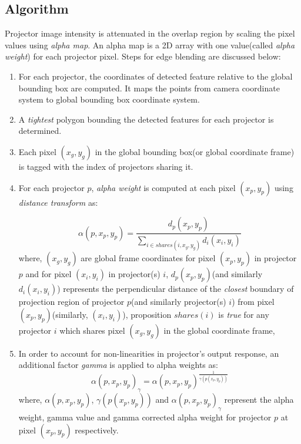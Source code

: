 \documentclass[letterpaper,10pt,conference]{/home/pranav/Desktop/Publication_work/latex_class_files/IEEEtran}
\begin{document}
\subsection{Algorithm}
Projector image intensity is attenuated in the overlap region by scaling the pixel values using \textit{alpha map}. An alpha map is a 2D array with one value(called \textit{alpha weight}) for each projector pixel. Steps for edge blending are discussed below:
\begin{enumerate}
\item For each projector, the coordinates of detected feature relative to the global bounding box are computed. It maps the points from camera coordinate system to global bounding box coordinate system. 
\item A \textit{tightest} polygon bounding the detected features for each projector is determined.
\item Each pixel $(x_g,y_g)$ in the global bounding box(or global coordinate frame) is tagged with the index of projectors sharing it.
\item For each projector $p$, \textit{alpha weight} is computed at each pixel $(x_p,y_p)$ using \textit{distance transform} as:

\begin{equation}
\alpha(p,x_p,y_p)=\frac{d_p(x_p,y_p)}{\sum\nolimits_{i \in shares(i,x_g,y_g)} d_i(x_i,y_i)}
\end{equation}
where, $(x_g,y_g)$ are global frame coordinates for pixel $(x_p,y_p)$ in projector $p$ and for pixel $(x_i,y_i)$ in projector(s) $i$, $d_p(x_p,y_p)$(and similarly $d_i(x_i,y_i)$) represents the perpendicular distance of the \textit{closest} boundary of projection region of projector $p$(and similarly projector(s) $i$) from pixel $(x_p,y_p)$(similarly, $(x_i,y_i)$), proposition $shares(i)$ is \textit{true} for any projector $i$ which shares pixel $(x_g,y_g)$ in the global coordinate frame,

\item In order to account for non-linearities in projector's output response, an additional factor \textit{gamma}\cite{paul} is applied to alpha weights as:
\begin{equation}
\alpha(p,x_p,y_p)_\gamma=\alpha(p,x_p,y_p)^{\frac{1}{\gamma(p(x_p,y_p))}}
\end{equation}
where, $\alpha(p,x_p,y_p)$, $\gamma(p(x_p,y_p))$ and  $\alpha(p,x_p,y_p)_\gamma$ represent the alpha weight, gamma value and gamma corrected alpha weight for projector $p$ at pixel $(x_p,y_p)$ respectively.
\end{enumerate}
\end{document}
